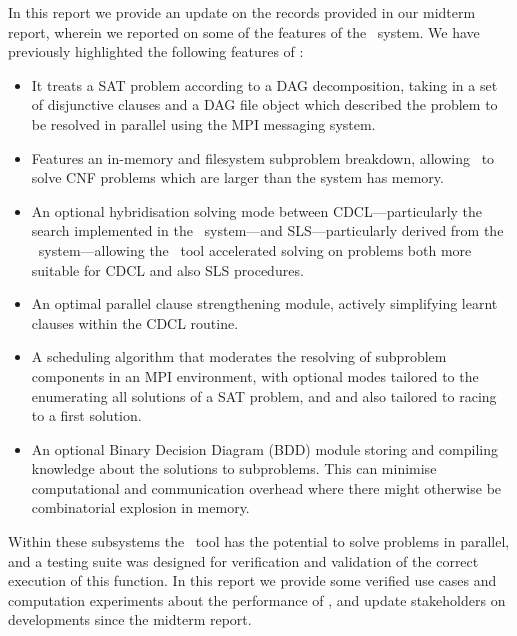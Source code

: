 \documentclass[
10pt, %
a4paper, %
oneside, %
headinclude,footinclude, %
BCOR5mm, %
]{scrartcl}
\begin{document}
In this report we provide an update on the records provided in our midterm report, wherein we reported on some of the features of the \dagster\ system.
We have previously highlighted the following features of \dagster:
\begin{itemize}
\item	It treats a SAT problem according to a DAG decomposition, taking in a set of disjunctive clauses and a DAG file object which described the problem to be resolved in parallel using the MPI messaging system.
\item	Features an in-memory and filesystem subproblem breakdown, allowing \dagster\ to solve CNF problems which are larger than the system has memory.
\item	An optional hybridisation solving mode between CDCL---particularly the search implemented in the \tinisat\ system---and SLS---particularly derived from the \gnoveltyp\ system---allowing the \dagster\ tool accelerated solving on problems both more suitable for CDCL and also SLS procedures.
\item	An optimal parallel clause strengthening module, actively simplifying learnt clauses within the CDCL routine.
\item	A scheduling algorithm that moderates the resolving of subproblem components in an MPI environment, with optional modes tailored to the enumerating all solutions of a SAT problem, and and also tailored to racing to a first solution.
\item	An optional Binary Decision Diagram (BDD) module storing and compiling knowledge about the solutions to subproblems. This can minimise computational and communication overhead where there might otherwise be combinatorial explosion in memory.
\end{itemize}

Within these subsystems the \dagster\ tool has the potential to solve problems in parallel, and a testing suite was designed for verification and validation of the correct execution of this function.
In this report we provide some verified use cases and computation experiments about the performance of \dagster, and update stakeholders on developments since the midterm report.
\end{document}
